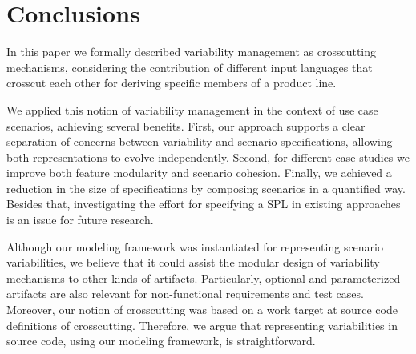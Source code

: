 \section{Conclusions}\label{sec:conclusions}

In this paper we formally described variability management as 
crosscutting mechanisms, considering the contribution
of different input languages that crosscut each other for deriving
specific members of a product line. 

We applied this notion of variability management in the context of use
case scenarios, achieving several benefits. First, our approach supports
a clear separation of concerns between variability and scenario specifications,
allowing both representations to evolve independently. Second, for different case studies we improve both feature modularity and scenario cohesion. Finally, we achieved a reduction in the size of specifications by composing scenarios in a quantified way. Besides that, investigating the effort for specifying a SPL in
existing approaches is an issue for future research.  

Although our modeling framework was instantiated for representing
scenario variabilities, we believe that it could assist the modular design of variability mechanisms to other kinds of artifacts. Particularly, optional and parameterized artifacts
are also relevant for non-functional requirements and test cases.
Moreover, our notion of crosscutting was based on a work target at source code definitions of crosscutting. Therefore,
we argue that representing variabilities in source code, using our modeling framework,
is straightforward.

